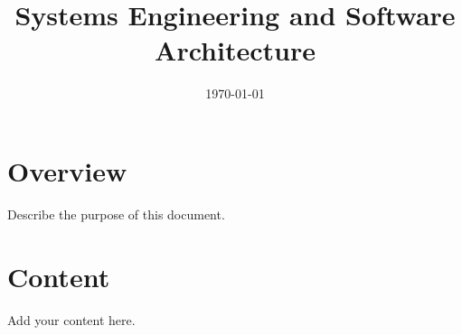 \documentclass[11pt]{article}
\title{Systems Engineering and Software Architecture}
\author{}
\date{\today}
\begin{document}
\maketitle

\section{Overview}
Describe the purpose of this document.

\section{Content}
Add your content here.
\end{document}
